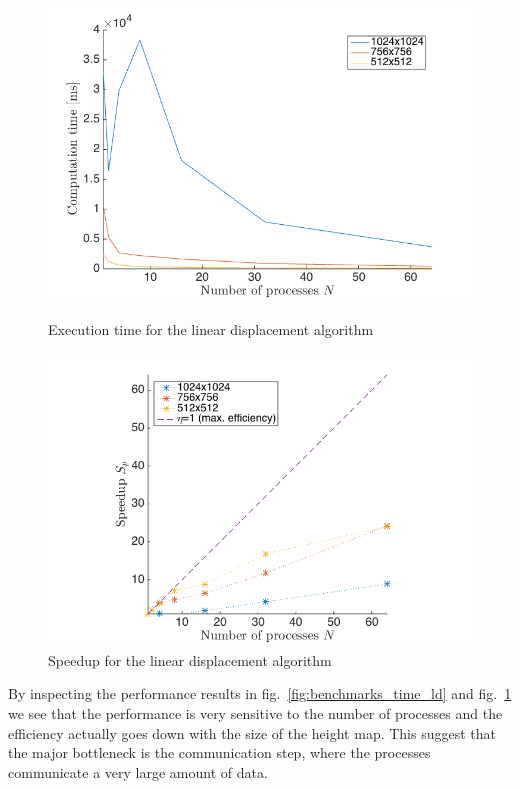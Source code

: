 \begin{figure}[!htb]
    \centering
    \includegraphics[width=\linewidth]{img/lines_benchmarks1.png}
    \caption{Execution time for the linear displacement algorithm}
    \label{fig:benchmarks_time_ld}
\endminipage\hfill
{}
    \centering
    \includegraphics[width=\linewidth]{img/lines_benchmarks2.png}
    \caption{Speedup for the linear displacement algorithm}
    \label{fig:benchmarks_speedup_ld}
\endminipage\hfill
\end{figure}

By inspecting the performance results in fig.~\ref{fig:benchmarks_time_ld} and fig.~\ref{fig:benchmarks_speedup_ld} we see that the performance is very sensitive to the number of processes and the efficiency actually goes down with the size of the height map.
This suggest that the major bottleneck is the communication step, where the processes communicate a very large amount of data.

